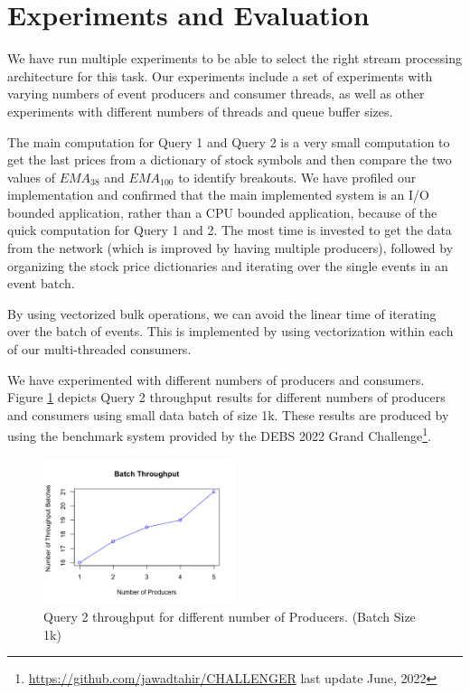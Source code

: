 \section{Experiments and Evaluation}\label{sec:experiments}

We have run multiple experiments to be able to select the right stream processing architecture for this task.
Our experiments include a set of experiments with varying numbers of event producers and consumer threads, as well as
other experiments with different numbers of threads and queue buffer sizes.

The main computation for Query 1 and Query 2 is a very small computation to get the last prices from a dictionary of stock symbols and then
compare the two values of $EMA_{38}$ and $EMA_{100}$ to identify breakouts. We have profiled our implementation and confirmed that the main implemented system
is an I/O bounded application, rather than a CPU bounded application, because of the quick computation for Query 1 and 2. The most time is
invested to get the data from the network (which is improved by having multiple producers), followed by organizing the stock price
dictionaries and iterating over the single events in an event batch.

By using vectorized bulk operations, we can avoid the linear time of iterating over the batch of events. This is implemented by using
vectorization within each of our multi-threaded consumers.

We have experimented with different numbers of producers and consumers.
Figure \ref{fig:evaluation} depicts Query 2 throughput results for different numbers of producers and consumers using small data batch of size 1k.
These results are produced by using the benchmark system provided by the DEBS 2022 Grand Challenge\footnote{\url{https://github.com/jawadtahir/CHALLENGER} last update June, 2022}.


\begin{figure}[]
    \begin{center}
        \includegraphics[width=0.5\textwidth]{./images/throughput.png}
        \caption{Query 2 throughput for different number of Producers. (Batch Size 1k)}
        \label{fig:evaluation}
    \end{center}
\end{figure}


